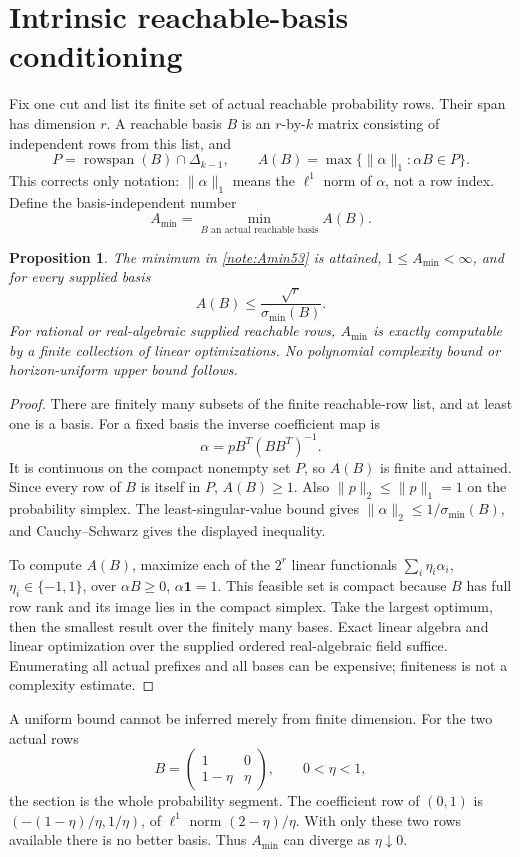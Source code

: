 \documentclass[11pt]{amsart}
\numberwithin{equation}{section}
\newtheorem{proposition}{Proposition}[section]
\newcommand{\norm}[1]{\lVert#1\rVert}
\begin{document}
\section{Intrinsic reachable-basis conditioning}
Fix one cut and list its finite set of actual reachable probability rows. Their span has dimension $r$. A reachable basis $B$ is an $r$-by-$k$ matrix consisting of independent rows from this list, and
\[
 P=\operatorname{rowspan}(B)\cap\Delta_{k-1},\qquad
 A(B)=\max\{\norm\alpha_1:\alpha B\in P\}.
\]
This corrects only notation: $\norm\alpha_1$ means the $\ell^1$ norm of $\alpha$, not a row index. Define the basis-independent number
\begin{equation}\label{note:Amin53}
 A_{\min}=\min_{B\text{ an actual reachable basis}} A(B).
\end{equation}
\begin{proposition}\label{note:conditioning53}
The minimum in \eqref{note:Amin53} is attained, $1\le A_{\min}<\infty$, and for every supplied basis
\[
 A(B)\le\frac{\sqrt r}{\sigma_{\min}(B)}.
\]
For rational or real-algebraic supplied reachable rows, $A_{\min}$ is exactly computable by a finite collection of linear optimizations. No polynomial complexity bound or horizon-uniform upper bound follows.
\end{proposition}
\begin{proof}
There are finitely many subsets of the finite reachable-row list, and at least one is a basis. For a fixed basis the inverse coefficient map is
\[
                  \alpha=pB^T(BB^T)^{-1}.
\]
It is continuous on the compact nonempty set $P$, so $A(B)$ is finite and attained. Since every row of $B$ is itself in $P$, $A(B)\ge1$. Also $\norm p_2\le\norm p_1=1$ on the probability simplex. The least-singular-value bound gives $\norm\alpha_2\le1/\sigma_{\min}(B)$, and Cauchy--Schwarz gives the displayed inequality.

To compute $A(B)$, maximize each of the $2^r$ linear functionals $\sum_i\eta_i\alpha_i$, $\eta_i\in\{-1,1\}$, over $\alpha B\ge0$, $\alpha\mathbf1=1$. This feasible set is compact because $B$ has full row rank and its image lies in the compact simplex. Take the largest optimum, then the smallest result over the finitely many bases. Exact linear algebra and linear optimization over the supplied ordered real-algebraic field suffice. Enumerating all actual prefixes and all bases can be expensive; finiteness is not a complexity estimate.
\end{proof}
A uniform bound cannot be inferred merely from finite dimension. For the two actual rows
\[
 B=\begin{pmatrix}1&0\\1-\eta&\eta\end{pmatrix},\qquad0<\eta<1,
\]
the section is the whole probability segment. The coefficient row of $(0,1)$ is $(-(1-\eta)/\eta,1/\eta)$, of $\ell^1$ norm $(2-\eta)/\eta$. With only these two rows available there is no better basis. Thus $A_{\min}$ can diverge as $\eta\downarrow0$.
\end{document}
